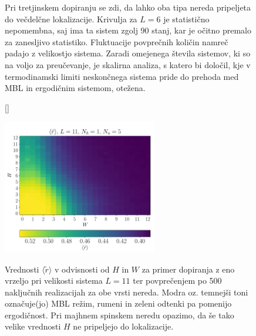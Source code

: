 \begin{figure}[H]
\caption{Pri tretjinskem dopiranju se zdi, da lahko oba tipa nereda pripeljeta do večdelčne lokalizacije. Krivulja za $L=6$ je statistično nepomembna, saj ima ta sistem zgolj 90 stanj, kar je očitno premalo za zanesljivo statistiko. Fluktuacije povprečnih količin namreč padajo z velikostjo sistema. Zaradi omejenega števila sistemov, ki so na voljo za preučevanje, je skalirna analiza, s katero bi določil, kje v termodinamski limiti neskončnega sistema pride do prehoda med MBL in ergodičnim sistemom, otežena.  }
\label{fig:double_plot_disorder_sym_break_12_4_4_slo}
\end{figure}
\begin{figure}[H]
[\FBwidth]
{\caption{Vrednosti $\langle \tilde{r}\rangle$ v odvisnosti od $H$ in $W$ za primer dopiranja z eno vrzeljo pri velikosti sistema $L=11$ ter povprečenjem po 500 naključnih realizacijah za obe vrsti nereda. Modra oz. temnejši toni označuje(jo) MBL režim, rumeni in zeleni odtenki pa pomenijo ergodičnost. Pri majhnem spinskem neredu opazimo, da še tako velike vrednosti $H$ ne pripeljejo do lokalizacije. }\label{fig:r_density_11_1_5}}
{\includegraphics[width=0.6\textwidth]{r_density_11_1_5.pdf}}
\end{figure}
